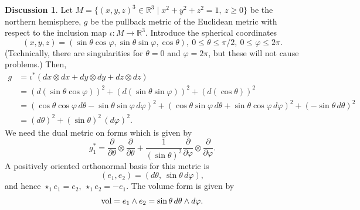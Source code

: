 \documentclass{elsarticle}
\theoremstyle{definition}
\newtheorem{discussion}[theorem]{Discussion}
\newcommand{\vol}{\mathop{\rm vol}\nolimits}
\newcommand{\R}{\mathbb{R}}
\newcommand{\set}[2]{\{#1 \mid #2\}}
\begin{document}
\begin{discussion}
  Let $M = \set{(x, y, z)^3 \in \R^3}{x^2 + y^2 + z^2 = 1,\ z \geq 0}$ be the northern hemisphere, $g$ be the pullback metric of the Euclidean metric with respect to the inclusion map $\iota \colon M \to \R^3$.
  Introduce the spherical coordinates
  \begin{equation}
    (x, y, z) = (\sin \theta \cos \varphi, \sin \theta \sin \varphi, \cos \theta),\
    0 \leq \theta \leq \pi / 2,\
    0 \leq \varphi \leq 2 \pi.
  \end{equation}
  (Technically, there are singularities for $\theta = 0$ and $\varphi = 2 \pi$, but these will not cause problems.)
  Then,
  \begin{equation}
    \begin{split}
      g
      & = \iota^*(d x \otimes d x + d y \otimes d y + d z \otimes d z) \\
      & = (d(\sin \theta \cos \varphi))^2
        + (d(\sin \theta \sin \varphi))^2
        + (d(\cos \theta))^2 \\
      & = (\cos \theta \cos \varphi\, d \theta
           - \sin \theta \sin \varphi\, d \varphi)^2
          + (\cos \theta \sin \varphi\, d \theta
             + \sin \theta \cos \varphi\, d \varphi)^2
          + (- \sin \theta\, d \theta)^2 \\
      & = (d \theta)^2 + (\sin \theta)^2\, (d \varphi)^2.
    \end{split}
  \end{equation}
  We need the dual metric on forms which is given by
  \begin{equation}
    g^*_1 = \frac{\partial}{\partial \theta} \otimes \frac{\partial}{\partial \theta}
      + \frac{1}{(\sin \theta)^2} \frac{\partial}{\partial \varphi} \otimes \frac{\partial}{\partial \varphi}.
  \end{equation}
  A positively oriented orthonormal basis for this metric is
  \begin{equation}
    (e_1, e_2) = (d \theta,\ \sin \theta\, d \varphi),
  \end{equation}
  and hence $\star_1 e_1 = e_2,\ \star_1 e_2 = - e_1$.
  The volume form is given by
  \begin{equation}
    \vol = e_1 \wedge e_2 = \sin \theta\, d \theta \wedge d \varphi.
  \end{equation}
\end{discussion}
\end{document}
